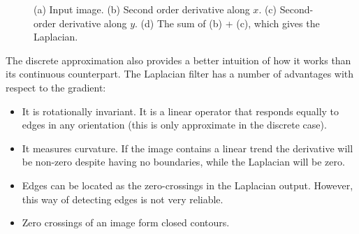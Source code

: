 \begin{figure}[h]
	\centerline{
	}
	\caption{(a) Input image. (b) Second order derivative along $x$. (c) Second-order derivative along $y$. (d) The sum of (b) + (c), which gives the Laplacian.}
	\label{fig:wheellaplacian}
\end{figure}




The discrete approximation also provides a better intuition of how it works than its continuous counterpart. The Laplacian filter has a number of advantages with respect to the gradient:
\begin{itemize}
	\item It is rotationally invariant. It is a linear operator that responds equally to edges in any orientation (this is only approximate in the discrete case).
	\item It measures curvature. If the image contains a linear trend the derivative will be non-zero despite having no boundaries, while the Laplacian will be zero.
	\item Edges can be located as the zero-crossings in the Laplacian output. However, this way of detecting edges is not very reliable.
	\item Zero crossings of an image form closed contours.
\end{itemize}


